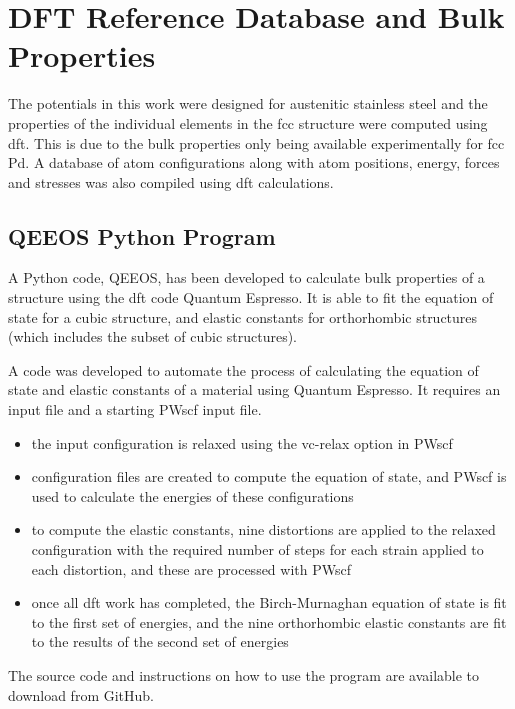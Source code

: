 \FloatBarrier
\section[DFT Results]{DFT Reference Database and Bulk Properties}

The potentials in this work were designed for austenitic stainless steel and the properties of the individual elements in the \acrshort{fcc} structure were computed using \acrshort{dft}.  This is due to the bulk properties only being available experimentally for \acrshort{fcc} \Gls{Pd}.  A database of atom configurations along with atom positions, energy, forces and stresses was also compiled using \acrshort{dft} calculations.


\subsection{QEEOS Python Program}
\label{section:qeeospyprog}

A Python code, QEEOS, has been developed to calculate bulk properties of a structure using the \acrshort{dft} code Quantum Espresso.  It is able to fit the equation of state for a cubic structure, and elastic constants for orthorhombic structures (which includes the subset of cubic structures).  

A code was developed to automate the process of calculating the equation of state and elastic constants of a material using Quantum Espresso.  It requires an input file and a starting PWscf input file.  

\begin{itemize}
\item the input configuration is relaxed using the vc-relax option in PWscf
\item configuration files are created to compute the equation of state, and PWscf is used to calculate the energies of these configurations
\item to compute the elastic constants, nine distortions are applied to the relaxed configuration with the required number of steps for each strain applied to each distortion, and these are processed with PWscf
\item once all \acrshort{dft} work has completed, the Birch-Murnaghan equation of state is fit to the first set of energies, and the nine orthorhombic elastic constants are fit to the results of the second set of energies
\end{itemize}

The source code and instructions on how to use the program are available to download from GitHub.

